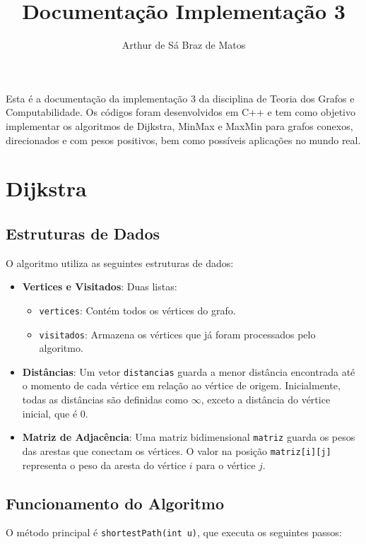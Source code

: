 \documentclass[12pt]{article}
\title{\textbf{Documentação Implementação 3}} %
\author{
  Arthur de Sá Braz de Matos\\
}
\date{}
\begin{document}
\maketitle
Esta é a documentação da implementação 3 da disciplina de Teoria dos Grafos e Computabilidade. Os códigos foram desenvolvidos em C++ e tem como objetivo implementar os algoritmos de Dijkstra, MinMax e MaxMin para grafos conexos, direcionados e com pesos positivos, bem como possíveis aplicações no mundo real.


\section{Dijkstra}

\subsection{Estruturas de Dados}

O algoritmo utiliza as seguintes estruturas de dados:
\begin{itemize}
    \item \textbf{Vertices e Visitados}: Duas listas:
    \begin{itemize}
        \item \texttt{vertices}: Contém todos os vértices do grafo.
        \item \texttt{visitados}: Armazena os vértices que já foram processados pelo algoritmo.
    \end{itemize}
    
    \item \textbf{Distâncias}: Um vetor \texttt{distancias} guarda a menor distância encontrada até o momento de cada vértice em relação ao vértice de origem. Inicialmente, todas as distâncias são definidas como \(\infty\), exceto a distância do vértice inicial, que é 0.
    
    \item \textbf{Matriz de Adjacência}: Uma matriz bidimensional \texttt{matriz} guarda os pesos das arestas que conectam os vértices. O valor na posição \texttt{matriz[i][j]} representa o peso da aresta do vértice \(i\) para o vértice \(j\).
\end{itemize}

\subsection{Funcionamento do Algoritmo}

O método principal é \texttt{shortestPath(int u)}, que executa os seguintes passos:
\end{document}
